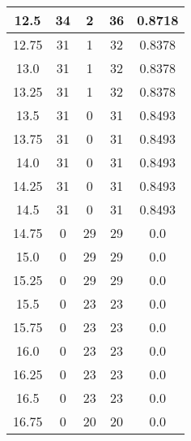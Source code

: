 \documentclass[letterpaper, 12pt]{article}
\begin{document}
\begin{longtable}{|c|c|c|c|c|}
\hline
12.5 & 34 & 2 & 36 & 0.8718 \\
\hline
12.75 & 31 & 1 & 32 & 0.8378 \\
\hline
13.0 & 31 & 1 & 32 & 0.8378 \\
\hline
13.25 & 31 & 1 & 32 & 0.8378 \\
\hline
13.5 & 31 & 0 & 31 & 0.8493 \\
\hline
13.75 & 31 & 0 & 31 & 0.8493 \\
\hline
14.0 & 31 & 0 & 31 & 0.8493 \\
\hline
14.25 & 31 & 0 & 31 & 0.8493 \\
\hline
14.5 & 31 & 0 & 31 & 0.8493 \\
\hline
14.75 & 0 & 29 & 29 & 0.0 \\
\hline
15.0 & 0 & 29 & 29 & 0.0 \\
\hline
15.25 & 0 & 29 & 29 & 0.0 \\
\hline
15.5 & 0 & 23 & 23 & 0.0 \\
\hline
15.75 & 0 & 23 & 23 & 0.0 \\
\hline
16.0 & 0 & 23 & 23 & 0.0 \\
\hline
16.25 & 0 & 23 & 23 & 0.0 \\
\hline
16.5 & 0 & 23 & 23 & 0.0 \\
\hline
16.75 & 0 & 20 & 20 & 0.0 \\
\hline
\end{longtable}
\end{document}
